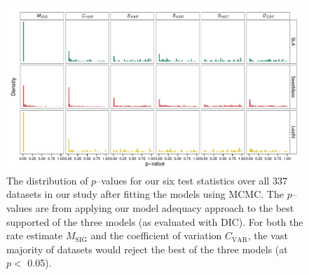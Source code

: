 \documentclass[a4paper,11pt]{article}
\begin{document}
\begin{figure}[p]
  \centering
  \includegraphics[angle=90, origin=c, scale=0.85]{figs/pval-hist-bayes}
  \caption{The distribution of $p$--values for our six test statistics over all 337 datasets in our study after fitting the models using MCMC. The $p$--values are from applying our model adequacy approach to the best supported of the three models (as evaluated with DIC). For both the rate estimate $M_{\text{SIG}}$ and the coefficient of variation $C_{\text{VAR}}$, the vast majority of datasets would reject the best of the three models (at $p<$ 0.05).}
  \label{fig:supp-pvalues}
\end{figure}
\end{document}
